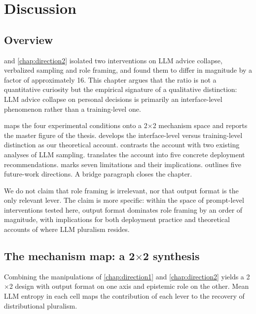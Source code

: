 \chapter{Discussion}
\label{chap:discussion}

\section{Overview}
\label{sec:disc_overview}

 and \cref{chap:direction2} isolated two
interventions on LLM advice collapse, verbalized sampling and role
framing, and found them to differ in magnitude by a factor of
approximately 16. This chapter argues that the ratio is not a
quantitative curiosity but the empirical signature of a qualitative
distinction: LLM advice collapse on personal decisions is primarily an
interface-level phenomenon rather than a training-level one.

 maps the four experimental conditions onto a 2$\times$2
mechanism space and reports the master figure of the thesis.
 develops the interface-level
versus training-level distinction as our theoretical account.
 contrasts the account with two existing
analyses of LLM sampling.  translates the
account into five concrete deployment recommendations.
 marks seven limitations and their
implications.  outlines five future-work
directions. A bridge paragraph closes the chapter.

We do not claim that role framing is irrelevant, nor that output
format is the only relevant lever. The claim is more specific: within
the space of prompt-level interventions tested here, output format
dominates role framing by an order of magnitude, with implications for
both deployment practice and theoretical accounts of where LLM
pluralism resides.

\section{The mechanism map: a 2$\times$2 synthesis}
\label{sec:disc_map}

Combining the manipulations of \cref{chap:direction1} and
\cref{chap:direction2} yields a 2$\times$2 design with output format
on one axis and epistemic role on the other. Mean LLM entropy in each
cell maps the contribution of each lever to the recovery of
distributional pluralism.

